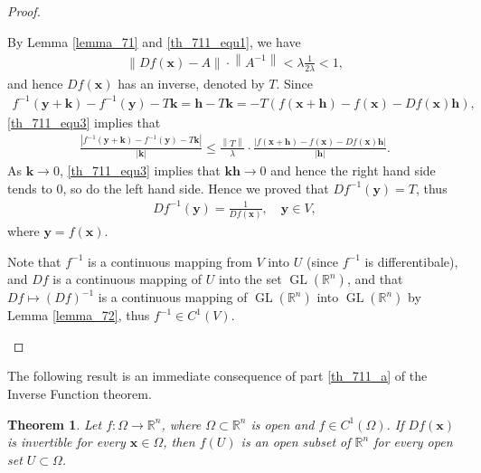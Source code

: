 \documentclass[10pt]{book}
\newtheorem{theorem}{Theorem}[chapter]
\theoremstyle{definition}
\numberwithin{equation}{chapter}
\begin{document}
\begin{proof}
\begin{enumerate}[label=(\alph*)]
    By Lemma \ref{lemma_71} and \eqref{th_711_equ1}, we have
    \begin{align*}
        \left\|Df(\mathbf{x}) - A\right\| \cdot \left\|A^{-1}\right\| < \lambda \frac{1}{2\lambda} < 1,
    \end{align*}
    and hence $Df(\mathbf{x})$ has an inverse, denoted by $T$. Since 
    \begin{align*}
        f^{-1}(\mathbf{y} + \mathbf{k}) - f^{-1}(\mathbf{y}) - T \mathbf{k} = \mathbf{h} - T \mathbf{k} = -T \left(f(\mathbf{x} + \mathbf{h}) - f(\mathbf{x}) - Df(\mathbf{x}) \mathbf{h}\right),
    \end{align*}
    \eqref{th_711_equ3} implies that
    \begin{align*}
        \frac{\left|f^{-1}(\mathbf{y} + \mathbf{k}) - f^{-1}(\mathbf{y}) - T \mathbf{k}\right|}{\left|\mathbf{k}\right|} \leq \frac{\left\|T\right\|}{\lambda} \cdot \frac{\left|f(\mathbf{x} + \mathbf{h}) - f(\mathbf{x}) - Df(\mathbf{x}) \mathbf{h}\right|}{\left|\mathbf{h}\right|}.
    \end{align*}
    As $\mathbf{k} \to 0$, \eqref{th_711_equ3} implies that $\mathbf{kh} \to 0$ and hence the right hand side tends to $0$, so do the left hand side. Hence we proved that $Df^{-1}(\mathbf{y}) = T$, thus
    \begin{align*}
        Df^{-1}(\mathbf{y}) = \frac{1}{Df(\mathbf{x})}, \quad \mathbf{y} \in V,
    \end{align*}
    where $\mathbf{y} = f(\mathbf{x})$.
    
    Note that $f^{-1}$ is a continuous mapping from $V$ into $U$ (since $f^{-1}$ is differentibale), and $Df$ is a continuous mapping of $U$ into the set $\operatorname{GL}(\mathbb{R}^n)$, and that $Df \mapsto \left(Df\right)^{-1}$ is a continuous mapping of $\operatorname{GL}(\mathbb{R}^n)$ into $\operatorname{GL}(\mathbb{R}^n)$ by Lemma \ref{lemma_72}, thus $f^{-1} \in C^1(V)$.
\end{enumerate}
\end{proof}

\medskip

The following result is an immediate consequence of part \ref{th_711_a} of the Inverse Function theorem.

\medskip

\begin{theorem}
Let $f: \Omega \to \mathbb{R}^n$, where $\Omega \subset \mathbb{R}^n$ is open and $f \in C^1(\Omega)$. If $Df(\mathbf{x})$ is invertible for every $\mathbf{x} \in \Omega$, then $f(U)$ is an open subset of $\mathbb{R}^n$ for every open set $U \subset \Omega$.
\end{theorem}
\end{document}
